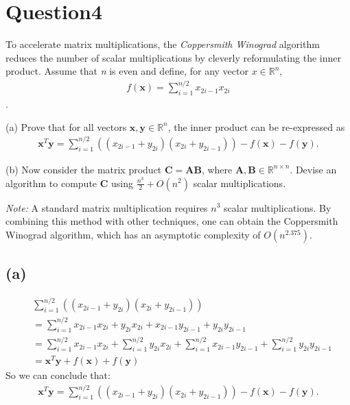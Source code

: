 \documentclass{article}
\newcommand{\R}{\mathbb{R}}
\begin{document}
\section*{Question4}
To accelerate matrix multiplications, the \textit{Coppersmith Winograd} algorithm reduces the number of scalar multiplications by cleverly reformulating
the inner product. Assume that \textit{n} is even and define, for any vector \(x \in \R^n\),
\begin{align*}
    f(\bm{x}) = \sum_{i = 1}^{n / 2} x_{2i - 1} x_{2i}
\end{align*}.


\noindent 
(a) Prove that for all vectors \(\bm{x}, \bm{y} \in \R^n\), the inner product can be re-expressed as
\begin{align*}
    \bm{x}^T\bm{y} = \sum_{i = 1}^{n / 2}((x_{2i - 1} + y_{2i})(x_{2i} + y_{2i - 1})) - f(\bm{x}) - f(\bm{y}).
\end{align*}

\noindent 
(b) Now consider the matrix product \(\bm{C} = \bm{A}\bm{B}\), where \(\bm{A}, \bm{B} \in \R^{n \times n}\). Devise an algorithm to compute \(\bm{C}\) using
\(\frac{n^3}{2} + \textit{O}(n^2)\) scalar multiplications.

\noindent
\textit{Note:} A standard matrix multiplication requires \(n^3\) scalar multiplications. By combining this method with other techniques, one can obtain
the Coppersmith Winograd algorithm, which has an asymptotic complexity of \(O(n^{2.375})\).

\subsection*{(a)}
\begin{align*}
    &\sum_{i = 1}^{n / 2}((x_{2i - 1} + y_{2i})(x_{2i} + y_{2i - 1})) \\
    &=\sum_{i = 1}^{n / 2}x_{2i - 1}x_{2i} + y_{2i}x_{2i} + x_{2i - 1}y_{2i - 1} +  y_{2i}y_{2i - 1} \\
    &=\sum_{i = 1}^{n / 2}x_{2i - 1}x_{2i} + \sum_{i = 1}^{n / 2}y_{2i}x_{2i} + \sum_{i = 1}^{n / 2}x_{2i - 1}y_{2i - 1} +  \sum_{i = 1}^{n / 2}y_{2i}y_{2i - 1} \\
    &= \bm{x}^T\bm{y} + f(\bm{x}) + f(\bm{y})
\end{align*}
So we can conclude that:
\begin{align*}
    \bm{x}^T\bm{y} = \sum_{i = 1}^{n / 2}((x_{2i - 1} + y_{2i})(x_{2i} + y_{2i - 1})) - f(\bm{x}) - f(\bm{y}).
\end{align*}
\end{document}
